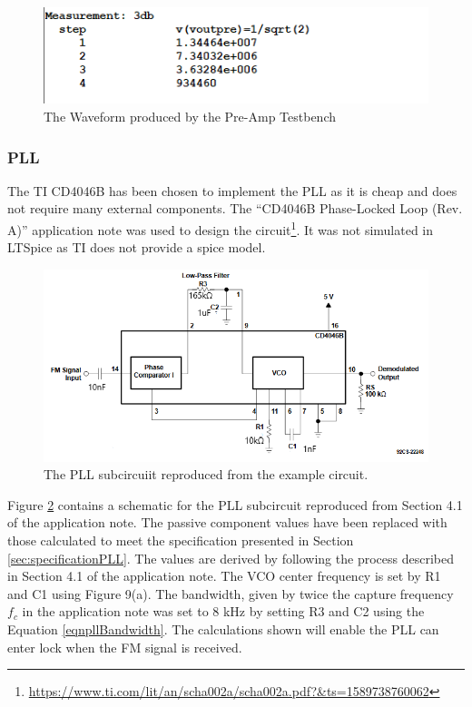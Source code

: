 \begin{figure}[H]
    \centering 
    \includegraphics[width=\textwidth]{../Circuits/Images/Pre-Amp/TestBenchOutput}
    \caption{The Waveform produced by the Pre-Amp Testbench}
    \label{fig:preAmpTestBenchOutput}
\end{figure}

\subsubsection{PLL}
The TI CD4046B has been chosen to implement the PLL as it is cheap and does not require many external components. 
The ``CD4046B Phase-Locked Loop (Rev. A)'' application note was used to design the circuit\footnote{\url{https://www.ti.com/lit/an/scha002a/scha002a.pdf?&ts=1589738760062}}. 
It was not simulated in LTSpice as TI does not provide a spice model.

\begin{figure}[H]
    \centering 
    \includegraphics[width=\textwidth]{../Circuits/Images/PLL/PLLReproduction}
    \caption{The PLL subcircuiit reproduced from the example circuit.}
    \label{fig:PLLSubcircuit}
\end{figure}

Figure \ref{fig:PLLSubcircuit} contains a schematic for the PLL subcircuit reproduced from Section 4.1 of the application note. 
The passive component values have been replaced with those calculated to meet the specification presented in Section \ref{sec:specificationPLL}. 
The values are derived by following the process described in Section 4.1 of the application note. 
The VCO center frequency is set by  R1 and C1 using Figure 9(a).
The bandwidth, given by twice the capture frequency $f_{c}$ in the application note was set to 8 kHz by setting R3 and C2 using the Equation \ref{eqnpllBandwidth}.
The calculations shown will enable the PLL can enter lock when the FM signal is received.

